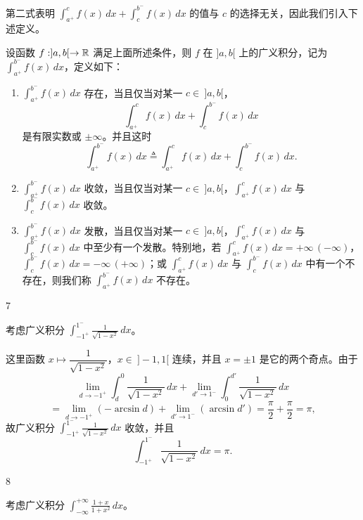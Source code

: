 第二式表明 $\displaystyle\int_{a^+}^cf(x)\,dx+\int_c^{b^-}f(x)\,dx$ 的值与 $c$ 的选择无关，因此我们引入下述定义。

\begin{mydef*}{}

设函数 $f:]a,b[\to\mathbb{R}$ 满足上面所述条件，则 $f$ 在 $]a,b[$ 上的广义积分，记为 $\displaystyle\int_{a^+}^{b^-}f(x)\,dx$，定义如下：

\begin{enumerate}[label=\arabic{enumi})]
\item $\displaystyle\int_{a^+}^{b^-}f(x)\,dx$ 存在，当且仅当对某一 $c\in\ ]a,b[$，
\[\int_{a^+}^{c}f(x)\,dx+\int_c^{b^-}f(x)\,dx\]
是有限实数或 $\pm\infty$。并且这时
\[\int_{a^+}^{b^-}f(x)\,dx\triangleq\int_{a^+}^{c}f(x)\,dx+\int_{c}^{b^-}f(x)\,dx.\]
\item $\displaystyle\int_{a^+}^{b^-}f(x)\,dx$ 收敛，当且仅当对某一 $c\in\ ]a,b[$，$\displaystyle\int_{a^+}^{c}f(x)\,dx$ 与 $\displaystyle\int_c^{b^-}f(x)\,dx$ 收敛。
\item $\displaystyle\int_{a^+}^{b^-}f(x)\,dx$ 发散，当且仅当对某一 $c\in\ ]a,b[$，$\displaystyle\int_{a^+}^{c}f(x)\,dx$ 与 $\displaystyle\int_c^{b^-}f(x)\,dx$ 中至少有一个发散。特别地，若 $\displaystyle\int_{a^+}^{c}f(x)\,dx=+\infty\,(-\infty)$，$\displaystyle\int_c^{b^-}f(x)\,dx=-\infty\,(+\infty)$；或 $\displaystyle\int_{a^+}^{c}f(x)\,dx$ 与 $\displaystyle\int_c^{b^-}f(x)\,dx$ 中有一个不存在，则我们称 $\displaystyle\int_{a^+}^{b^-}f(x)\,dx$ 不存在。
\end{enumerate}

\end{mydef*}

\begin{sourceexample}{7}

考虑广义积分 $\displaystyle\int_{-1^+}^{1^-}\frac{1}{\sqrt{1-x^2}}\,dx$。

\end{sourceexample}

这里函数 $x\longmapsto\dfrac{1}{\sqrt{1-x^2}}$，$x\in\ ]-1,1[$ 连续，并且 $x=\pm1$ 是它的两个奇点。由于
\[\lim_{d\to-1^+}\int_d^0\frac{1}{\sqrt{1-x^2}}\,dx+\lim_{d'\to1^-}\int_0^{d'}\frac{1}{\sqrt{1-x^2}}\,dx\]
\[=\lim_{d\to-1^+}(-\arcsin d)+\lim_{d'\to1^-}(\arcsin d')=\frac{\pi}{2}+\frac{\pi}{2}=\pi,\]
故广义积分 $\displaystyle\int_{-1^+}^{1^-}\frac{1}{\sqrt{1-x^2}}\,dx$ 收敛，并且
\[\int_{-1^+}^{1^-}\frac{1}{\sqrt{1-x^2}}\,dx=\pi.\]

\begin{sourceexample}{8}

考虑广义积分 $\displaystyle\int_{-\infty}^{+\infty}\frac{1+x}{1+x^2}\,dx$。

\end{sourceexample}

